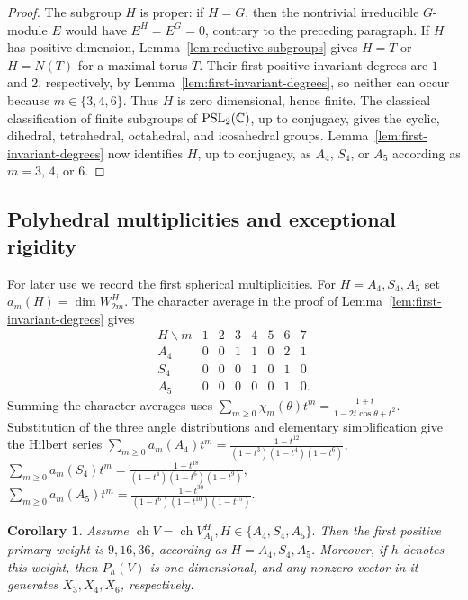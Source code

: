 \documentclass[10pt,a4paper]{amsart}
\numberwithin{equation}{section} \newtheorem{thm}{Theorem}[section] \newtheorem{lem}[thm]{Lemma} \newtheorem{ex}[thm]{Example} \newtheorem{prop}[thm]{Proposition} \newtheorem{cor}[thm]{Corollary} \newtheorem{defi}[thm]{Definition} \newtheorem{rmk}[thm]{Remark} \newtheorem{notation}[thm]{Notation}
\newcommand{\ch}{\operatorname{ch}}
\newcommand{\PSLtwo}{\operatorname{PSL}_2(\C)}
\begin{document}
\begin{proof}
The subgroup $H$ is proper: if $H=G$, then the nontrivial irreducible $G$-module $E$ would have $E^H=E^G=0$, contrary to the preceding paragraph. If $H$ has positive dimension, Lemma~\ref{lem:reductive-subgroups} gives $H=T$ or $H=N(T)$ for a maximal torus $T$. Their first positive invariant degrees are $1$ and $2$, respectively, by Lemma~\ref{lem:first-invariant-degrees}, so neither can occur because $m\in\{3,4,6\}$. Thus $H$ is zero dimensional, hence finite. The classical classification of finite subgroups of $\PSLtwo$, up to conjugacy, gives the cyclic, dihedral, tetrahedral, octahedral, and icosahedral groups. Lemma~\ref{lem:first-invariant-degrees} now identifies $H$, up to conjugacy, as $A_4$, $S_4$, or $A_5$ according as $m=3$, $4$, or $6$.
\end{proof}

\subsection{Polyhedral multiplicities and exceptional rigidity}

For later use we record the first spherical multiplicities. For $H=A_4,S_4,A_5$ set \(a_m(H)=\dim W_{2m}^H.\) The character average in the proof of Lemma~\ref{lem:first-invariant-degrees} gives
\[
\begin{array}{c|rrrrrrr}
H\backslash m&1&2&3&4&5&6&7\\ \hline
A_4&0&0&1&1&0&2&1\\
S_4&0&0&0&1&0&1&0\\
A_5&0&0&0&0&0&1&0.
\end{array}
\]
Summing the character averages uses \(\sum_{m\ge0}\chi_m(\theta)t^m=\frac{1+t}{1-2t\cos\theta+t^2}\). Substitution of the three angle distributions and elementary simplification give the Hilbert series \(\sum_{m\ge0}a_m(A_4)t^m=\frac{1-t^{12}}{(1-t^3)(1-t^4)(1-t^6)},\) \(\sum_{m\ge0}a_m(S_4)t^m=\frac{1-t^{18}}{(1-t^4)(1-t^6)(1-t^9)},\) \(\sum_{m\ge0}a_m(A_5)t^m=\frac{1-t^{30}}{(1-t^6)(1-t^{10})(1-t^{15})}.\)

\begin{cor}\label{cor:exceptional-first-simple}
Assume \(\ch V=\ch V_{A_1}^{H},H\in\{A_4,S_4,A_5\}.\) Then the first positive primary weight is \(9,16,36\), according as \(H=A_4,S_4,A_5\). Moreover, if $h$ denotes this weight, then \(P_h(V)\) is one-dimensional, and any nonzero vector in it generates \(X_3,X_4,X_6\), respectively.
\end{cor}
\end{document}
